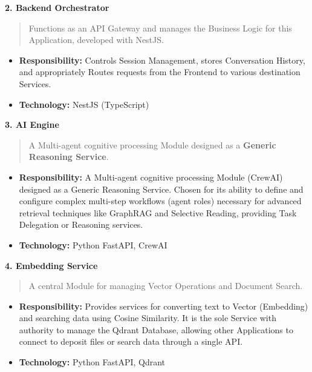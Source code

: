 \documentclass[12pt]{article}
\begin{document}
\textbf{2. Backend Orchestrator}

\begin{quote}
Functions as an API Gateway and manages the Business Logic for this
Application, developed with NestJS.
\end{quote}

\begin{itemize}
\item
  \textbf{Responsibility:} Controls Session Management, stores
  Conversation History, and appropriately Routes requests from the
  Frontend to various destination Services.
\item
  \textbf{Technology:} NestJS (TypeScript)
\end{itemize}

\textbf{3. AI Engine}

\begin{quote}
A Multi-agent cognitive processing Module designed as a \textbf{Generic
Reasoning Service}.
\end{quote}

\begin{itemize}
\item
  \textbf{Responsibility:} A Multi-agent cognitive processing Module
  (CrewAI) designed as a Generic Reasoning Service. Chosen for its
  ability to define and configure complex multi-step workflows (agent
  roles) necessary for advanced retrieval techniques like GraphRAG and
  Selective Reading, providing Task Delegation or Reasoning services.
\item
  \textbf{Technology:} Python FastAPI, CrewAI
\end{itemize}

\textbf{4. Embedding Service}

\begin{quote}
A central Module for managing Vector Operations and Document Search.
\end{quote}

\begin{itemize}
\item
  \textbf{Responsibility:} Provides services for converting text to
  Vector (Embedding) and searching data using Cosine Similarity. It is
  the sole Service with authority to manage the Qdrant Database,
  allowing other Applications to connect to deposit files or search data
  through a single API.
\item
  \textbf{Technology:} Python FastAPI, Qdrant
\end{itemize}
\end{document}

